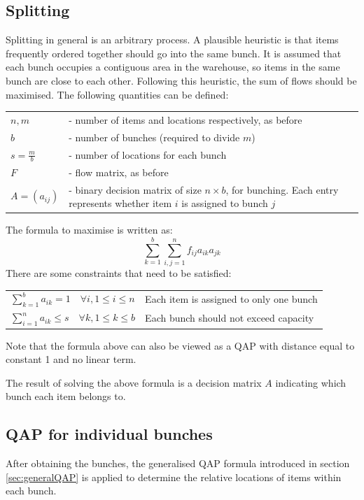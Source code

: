 \documentclass[hyp]{socreport}
\begin{document}
\subsection{Splitting}
\label{sec:splitting}
Splitting in general is an arbitrary process. A plausible heuristic is that items frequently ordered together should go into the same bunch. It is assumed that each bunch occupies a contiguous area in the warehouse, so items in the same bunch are close to each other. Following this heuristic, the sum of flows should be maximised. The following quantities can be defined:

\begin{tabular}{ll}
$n,m$ & - number of items and locations respectively, as before\\
$b$ & - number of bunches (required to divide $m$)\\
$s = \frac{m}{b}$ &- number of locations for each bunch\\
$F$ &- flow matrix, as before\\
$A = (a_{ij})$ & - binary decision matrix of size $n\times b$, for bunching. Each entry represents whether item $i$ is assigned to bunch $j$
\end{tabular}

The formula to maximise is written as: \[\sum_{k=1}^{b}\sum_{i,j=1}^{n}f_{ij}a_{ik}a_{jk}\]
There are some constraints that need to be satisfied:

\begin{tabular}{ll}
$\sum_{k=1}^{b}a_{ik} = 1 \quad \forall i, 1\leq i\leq n$ & Each item is assigned to only one bunch\\
$\sum_{i=1}^{n}a_{ik} \leq s \quad \forall k, 1\leq k \leq b$ & Each bunch should not exceed capacity\\
\end{tabular}

\bigskip Note that the formula above can also be viewed as a QAP with distance equal to constant 1 and no linear term.

The result of solving the above formula is a decision matrix $A$ indicating which bunch each item belongs to.

\subsection{QAP for individual bunches}
After obtaining the bunches, the generalised QAP formula introduced in section \ref{sec:generalQAP} is applied to determine the relative locations of items within each bunch.
\end{document}
